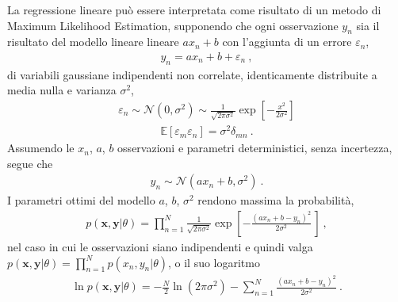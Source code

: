 \documentclass[letterpaper,10pt,italian]{jupyterBook}
\begin{document}
\sphinxAtStartPar
La regressione lineare può essere interpretata come risultato di un metodo di Maximum Likelihood Estimation, supponendo che ogni osservazione \(y_n\) sia il risultato del modello lineare lineare \(a x_n + b\) con l’aggiunta di un errore \(\varepsilon_n\),
\begin{equation*}
\begin{split}y_n = a x_n + b + \varepsilon_n \ ,\end{split}
\end{equation*}
\sphinxAtStartPar
di variabili gaussiane indipendenti non correlate, identicamente distribuite a media nulla e varianza \(\sigma^2\),
\begin{equation*}
\begin{split}\varepsilon_n \sim \mathscr{N}(0, \sigma^2) \sim \frac{1}{\sqrt{2 \pi \sigma^2}} \exp\left[ - \frac{x^2}{2 \sigma^2} \right]\end{split}
\end{equation*}\begin{equation*}
\begin{split}\mathbb{E}[\varepsilon_m \varepsilon_n] = \sigma^2 \delta_{mn} \ .\end{split}
\end{equation*}
\sphinxAtStartPar
Assumendo le \(x_n\), \(a\), \(b\) osservazioni e parametri deterministici, senza incertezza, segue che
\begin{equation*}
\begin{split}y_n \sim \mathscr{N}(a x_n + b, \sigma^2) \ .\end{split}
\end{equation*}
\sphinxAtStartPar
I parametri ottimi del modello \(a\), \(b\), \(\sigma^2\) rendono massima la probabilità,
\begin{equation*}
\begin{split}p(\mathbf{x},\mathbf{y}|\theta) = \prod_{n=1}^N \frac{1}{\sqrt{2 \pi \sigma^2}} \exp\left[ -\frac{(a x_n + b - y_n)^2}{2\sigma^2} \frac{}{} \right] \ ,\end{split}
\end{equation*}
\sphinxAtStartPar
nel caso in cui le osservazioni siano indipendenti e quindi valga \(p(\mathbf{x},\mathbf{y}|\theta) = \prod_{n=1}^N p(x_n,y_n|\theta)\), o il suo logaritmo
\begin{equation*}
\begin{split}\ln p(\mathbf{x},\mathbf{y}|\theta) = - \frac{N}{2} \ln (2\pi \sigma^2) - \sum_{n=1}^N \frac{(a x_n + b - y_n)^2}{2 \sigma^2} \ .\end{split}
\end{equation*}
\end{document}

